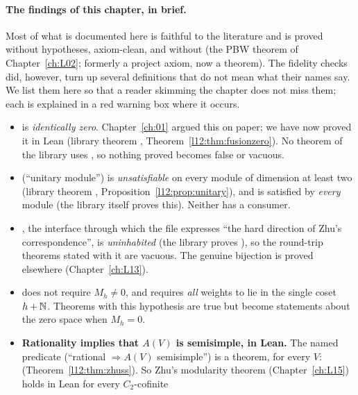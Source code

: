 \paragraph{The findings of this chapter, in brief.} Most of what is documented here is faithful to
the literature and is proved without hypotheses, axiom-clean, and without  (the PBW theorem of Chapter~\ref{ch:L02}; formerly a project axiom, now a theorem). The fidelity checks did, however, turn up several definitions that do not mean what
their names say. We list them here so that a reader skimming the chapter does not miss them; each
is explained in a red warning box where it occurs.
\begin{itemize}
\item {} is \emph{identically zero}. Chapter~\ref{ch:01} argued this on paper; we
  have now proved it in Lean (library theorem , Theorem~\ref{l12:thm:fusionzero}).
  No theorem of the library uses , so nothing proved becomes false or vacuous.
\item {} (``unitary module'') is \emph{unsatisfiable} on every module of dimension at
  least two (library theorem ,
  Proposition~\ref{l12:prop:unitary}), and  is satisfied by
  \emph{every} module (the library itself proves this). Neither has a consumer.
\item {}, the interface through which the file
   expresses ``the hard direction of Zhu's correspondence'',
  is \emph{uninhabited} (the library proves \allowbreak{}\allowbreak{}), so the
  round-trip theorems stated with it are vacuous. The genuine bijection is proved elsewhere
  (Chapter~\ref{ch:L13}).
\item {} does not require $M_h\neq0$, and requires \emph{all} weights to lie
  in the single coset $h+{\mathbb{N}}$. Theorems with this hypothesis are true but become statements about the
  zero space when $M_h = 0$.
\item \textbf{Rationality implies that $A(V)$ is semisimple, in Lean.} The named predicate 
  (``rational $\Rightarrow A(V)$ semisimple'') is a theorem, for every $V$: \allowbreak{}\allowbreak{}
  (Theorem~\ref{l12:thm:zhuss}). So Zhu's modularity theorem (Chapter~\ref{ch:L15}) holds in Lean for every $C_2$-cofinite

\end{itemize}

